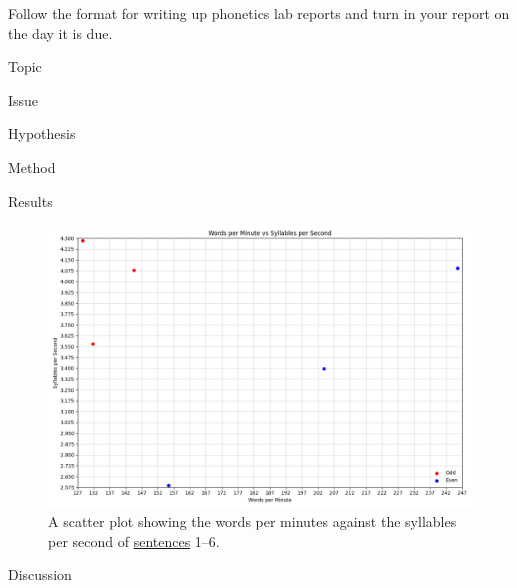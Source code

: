 \documentclass[lab=1,title={Speaking rate},turnin=false]{com310lab}
\begin{document}
\begin{writeup}
	Follow the format for writing up phonetics lab reports and turn in your report on the day it is due.
\end{writeup}

\pagebreak

\labtitle

\begin{topic}
	Topic
\end{topic}

\begin{issue}
	Issue
\end{issue}

\begin{hypothesis}
	Hypothesis
\end{hypothesis}

\begin{method}
	Method
\end{method}

\begin{results}
	Results


	\begin{figure}[H]
		\centering
		\caption{A scatter plot showing the words per minutes against the syllables per second of \hyperref[tab:data]{sentences} 1--6.}
		\label{fig:results}
		\includegraphics[width=\textwidth]{washington_lab1_graph}
	\end{figure}
\end{results}

\begin{discussion}
	Discussion
\end{discussion}
\end{document}

